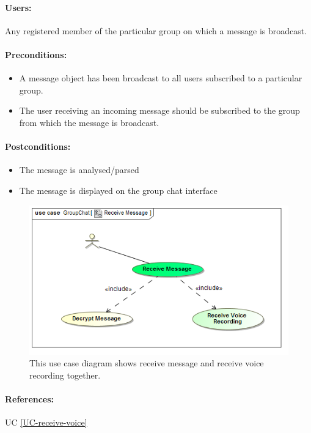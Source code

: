 \documentclass[11pt]{article}
\begin{document}
\paragraph{Users:} Any registered member of the particular group on which a message is broadcast.
\paragraph{Preconditions:} 
\begin{itemize}
\item A message object has been broadcast to all users subscribed to a particular group.
\item The user receiving an incoming message should be subscribed to the group from which the message is broadcast.
\end{itemize}
\paragraph{{Postconditions:}}
\begin{itemize}
\item The message is analysed/parsed
\item The message is displayed on the group chat interface
\end{itemize}
\begin{figure}[H]
\centering
\includegraphics[width=5in]{./images/UC_Receive_Message.png}
\caption[Receive Message Use Case Diagram]{This use case diagram shows receive message and receive voice recording together.}
\label{FR-figure-create-group}
\end{figure}
\paragraph{References:} UC \ref{UC-receive-voice}
\end{document}
